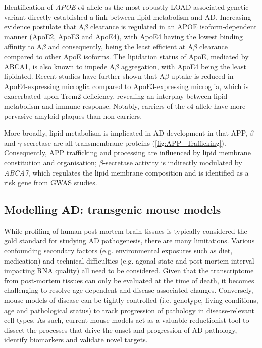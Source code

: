 \label{intro_lipid}
Identification of \textit{APOE} $\epsilon$4 allele as the most robustly LOAD-associated genetic variant directly established a link between lipid metabolism and AD. Increasing evidence postulate that A$\beta$ clearance is regulated in an APOE isoform-dependent manner (ApoE2, ApoE3 and ApoE4)\cite{Castellano2011}, with ApoE4 having the lowest binding affinity to A$\beta$ and consequently, being the least efficient at A$\beta$ clearance compared to other ApoE isoforms\cite{RM2012}. The lipidation status of ApoE, mediated by ABCA1\cite{R2010}, is also known to impede A$\beta$ aggregation, with ApoE4 being the least lipidated\cite{DM2006}. Recent studies have further shown that A$\beta$ uptake is reduced in ApoE4-expressing microglia compared to ApoE3-expressing microglia, which is exacerbated upon Trem2 deficiency, revealing an interplay between lipid metabolism and immune response\cite{Fitz2021}. Notably, carriers of the $\epsilon$4 allele have more pervasive amyloid plaques than non-carriers\cite{DE1993,E2009}.

More broadly, lipid metabolism is implicated in AD development in that APP, $\beta$- and $\gamma$-secretase are all transmembrane proteins (\cref{fig:APP_Trafficking}). Consequently, APP trafficking and processing are influenced by lipid membrane constitution and organisation\cite{DiPaolo2011}; $\beta$-secretase activity is indirectly modulated by \textit{ABCA7}, which regulates the lipid membrane composition and is identified as a risk gene from GWAS studies\cite{Sierksma2020,Sakae2016}.  


\clearpage
\subsection{Modelling AD: transgenic mouse models}
While profiling of human post-mortem brain tissues is typically considered the gold standard for studying AD pathogenesis, there are many limitations. Various confounding secondary factors (e.g. environmental exposures such as diet, medication) and technical difficulties (e.g. agonal state and post-mortem interval impacting RNA quality) all need to be considered. Given that the transcriptome from post-mortem tissues can only be evaluated at the time of death, it becomes challenging to resolve age-dependent and disease-associated changes. Conversely, mouse models of disease can be tightly controlled (i.e. genotype, living conditions, age and pathological status) to track progression of pathology in disease-relevant cell-types. As such, current mouse models act as a valuable reductionist tool to dissect the processes that drive the onset and progression of AD pathology, identify biomarkers and validate novel targets\cite{Hall2012}.

